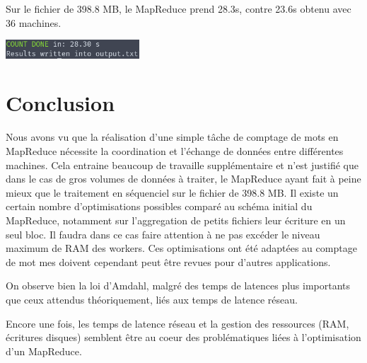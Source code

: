 \documentclass[11pt,a4paper]{article}
\begin{document}
Sur le fichier de 398.8 MB, le MapReduce prend 28.3s, contre 23.6s obtenu avec 36 machines.

\includegraphics[width=5cm]{screenshot_seq2.png}

\section{Conclusion}

Nous avons vu que la réalisation d'une simple tâche de comptage de mots en MapReduce nécessite la coordination et l'échange de données entre différentes machines. Cela entraine beaucoup de travaille supplémentaire et n'est justifié que dans le cas de gros volumes de données à traiter, le MapReduce ayant fait à peine mieux que le traitement en séquenciel sur le fichier de 398.8 MB. Il existe un certain nombre d'optimisations possibles comparé au schéma initial du MapReduce, notamment sur l'aggregation de petits fichiers leur écriture en un seul bloc. Il faudra dans ce cas faire attention à ne pas excéder le niveau maximum de RAM des workers. Ces optimisations ont été adaptées au comptage de mot mes doivent cependant peut être revues pour d'autres applications.

On observe bien la loi d'Amdahl, malgré des temps de latences plus importants que ceux attendus théoriquement, liés aux temps de latence réseau.

Encore une fois, les temps de latence réseau et la gestion des ressources (RAM, écritures disques) semblent être au coeur des problématiques liées à l'optimisation d'un MapReduce.
\end{document}
